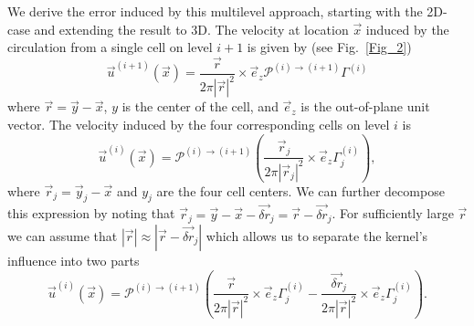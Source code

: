 \documentclass[11pt]{article}
\begin{document}
We derive the error induced by this multilevel approach, starting with the 2D-case and extending the result to 3D. The velocity at location $\vec x$ induced by the circulation from a single cell on level $i+1$ is given by (see Fig.~\ref{Fig_2})
\begin{equation}\label{eq:induced_1}
    \vec{u}^{(i+1)}(\vec{x}) = \frac{\vec{r}}{2\pi|\vec{r}|^2}\times\vec{e}_z\mathcal{P}^{(i)\to(i+1)}\Gamma^{(i)}
\end{equation}
where $\vec{r}=\vec{y}-\vec{x}$, $y$ is the center of the cell, and $\vec{e}_z$ is the out-of-plane unit vector. The velocity induced by the four corresponding cells on level $i$ is
\begin{equation}
    \vec{u}^{(i)}(\vec{x}) = \mathcal{P}^{(i)\to(i+1)}
    \left(\frac{\vec{r}_j}{2\pi|\vec{r}_j|^2}\times\vec{e}_z\Gamma^{(i)}_j\right),
\end{equation}
where $\vec{r}_j=\vec{y}_j-\vec{x}$ and $y_j$ are the four cell centers. We can further decompose this expression by noting that $\vec{r}_j=\vec{y}-\vec{x}-\vec{\delta r}_j=\vec{r}-\vec{\delta r}_j$.
For sufficiently large $\vec{r}$ we can assume that $|\vec{r}|\approx|\vec{r}-\vec{\delta r}_j|$ %
which allows us to separate the kernel's influence into two parts
\begin{equation}
    \vec{u}^{(i)}(\vec{x}) = \mathcal{P}^{(i)\to(i+1)}    \left(\frac{\vec{r}}{2\pi|\vec{r}|^2}\times\vec{e}_z\Gamma^{(i)}_j-\frac{\vec{\delta r}_j}{2\pi|\vec{r}|^2}\times\vec{e}_z\Gamma^{(i)}_j\right).
\end{equation}
\end{document}
